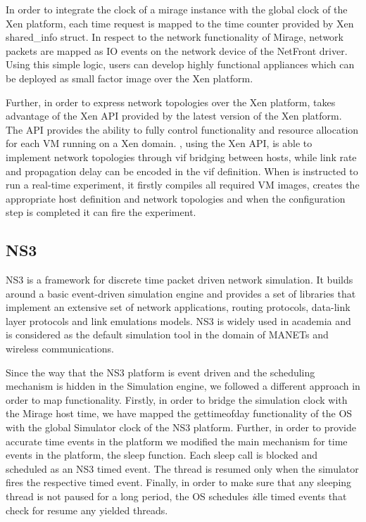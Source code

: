 In order to integrate the clock of a mirage instance with the global clock of
the Xen platform, each time request is mapped to the time counter provided by Xen
shared\_info struct. In respect to the network functionality of Mirage, network
packets are mapped as IO events on the network device of the NetFront driver.
Using this simple logic, users can develop highly functional appliances which
can be deployed as small factor image over the Xen platform.

Further, in order to express network topologies over the Xen platform, 
\sdnsim takes advantage of the Xen API provided by the
latest version of the Xen platform. The API provides the ability to fully
control functionality and resource allocation for each VM running on a Xen
domain. \sdnsim, using the Xen API, is able to implement network 
topologies through vif bridging between hosts, while link
rate and propagation delay can be encoded in the vif definition. 
When \sdnsim  is instructed to run a real-time experiment, it firstly compiles 
all required VM images, creates the appropriate host definition and network
topologies and when the configuration step is completed it can fire the
experiment.

\subsection{NS3}

NS3 is a framework for discrete time packet driven network simulation. It
builds around a basic event-driven simulation engine and provides a set of
libraries that implement an extensive set of network applications, routing
protocols, data-link layer protocols and link emulations models. NS3 is widely
used in academia and is considered as the default simulation tool in the
domain of MANETs and wireless communications. 

Since the way that the NS3 platform is event driven and the scheduling mechanism
is hidden in the Simulation engine, we followed a different approach in order to
map \mirage functionality.
Firstly, in order to bridge the simulation clock with the Mirage host time, we have
mapped the gettimeofday functionality of the OS with the global Simulator
clock of the NS3 platform. Further, in order to provide accurate time events in
the \mirage platform we modified the main mechanism for time events in the
platform, the sleep function. Each sleep call is blocked and scheduled
as an NS3 timed event. The thread is resumed only when the simulator fires the
respective timed event. Finally, in order to make sure that any sleeping thread
is not paused for a long period, the OS schedules {\emph idle} timed events that
check for resume any yielded threads.

